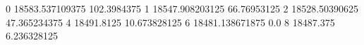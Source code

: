 0 18583.537109375 102.3984375
1 18547.908203125 66.76953125
2 18528.50390625 47.365234375
4 18491.8125 10.673828125
6 18481.138671875 0.0
8 18487.375 6.236328125
